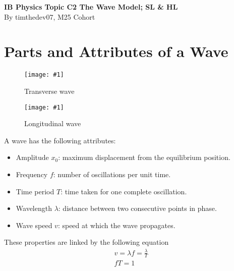\documentclass[a4paper,12pt]{article}
\let\oldsection\section
\renewcommand\section{\clearpage\oldsection}
\newcommand{\img}[4]{\begin{center}
  \begin{figure}[H]
    \centering
    \texttt{[image: \#1]}
    \caption{#3}
    \label{fig:#4}
  \end{figure}
\end{center}}
\begin{document}
\pagestyle{fancy}


\begin{titlepage}
  \begin{center}

    \vspace*{8cm}
    \textbf{\Large {IB Physics Topic C2 The Wave Model; SL \& HL}} \\
    \vspace*{1cm}
    \large{By timthedev07, M25 Cohort}


  \end{center}
\end{titlepage}

\pagebreak
\tableofcontents
\pagebreak

\clearpage
\setcounter{page}{1}

\section{Parts and Attributes of a Wave}

\begin{minipage}{0.45\textwidth}
  \img{transverse1.png}{1}{Transverse wave}{transverse1}
\end{minipage}\hspace*{0.1\textwidth}%
\begin{minipage}{0.45\textwidth}
  \img{longitudinal1.png}{1}{Longitudinal wave}{longitudinal1}
\end{minipage}

A wave has the following attributes:
\begin{itemize}
  \item Amplitude $x_0$: maximum displacement from the equilibrium position.
  \item Frequency $f$: number of oscillations per unit time.
  \item Time period $T$: time taken for one complete oscillation.
  \item Wavelength $\lambda$: distance between two consecutive points in phase.
  \item Wave speed $v$: speed at which the wave propagates.
\end{itemize}
These properties are linked by the following equation
\begin{align*}
  v = \lambda f = \frac{\lambda}{T} \\
  fT = 1
\end{align*}
\end{document}
